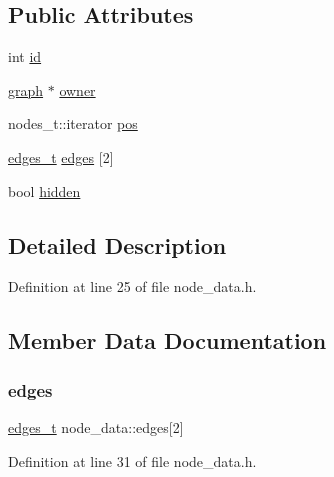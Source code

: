 \subsection*{Public Attributes}
\begin{DoxyCompactItemize}
\item 
int \mbox{\hyperlink{classnode__data_ac87541ac4470e3c17df808ec9a67f6c4}{id}}
\item 
\mbox{\hyperlink{classgraph}{graph}} $\ast$ \mbox{\hyperlink{classnode__data_a20acb07c56fa28df6cbdbf3b0a02cb66}{owner}}
\item 
nodes\+\_\+t\+::iterator \mbox{\hyperlink{classnode__data_ab3deb00e39c12058e58a99a38507f344}{pos}}
\item 
\mbox{\hyperlink{edge_8h_a8f9587479bda6cf612c103494b3858e3}{edges\+\_\+t}} \mbox{\hyperlink{classnode__data_a91690d6d2594423c2cdf8ea083c8bd75}{edges}} \mbox{[}2\mbox{]}
\item 
bool \mbox{\hyperlink{classnode__data_a0a841a84f5038562908d726392ce1b55}{hidden}}
\end{DoxyCompactItemize}


\subsection{Detailed Description}


Definition at line 25 of file node\+\_\+data.\+h.



\subsection{Member Data Documentation}
\mbox{\label{classnode__data_a91690d6d2594423c2cdf8ea083c8bd75}} 
\subsubsection{\texorpdfstring{edges}{edges}}
{\footnotesize\ttfamily \mbox{\hyperlink{edge_8h_a8f9587479bda6cf612c103494b3858e3}{edges\+\_\+t}} node\+\_\+data\+::edges\mbox{[}2\mbox{]}}



Definition at line 31 of file node\+\_\+data.\+h.

\mbox{\label{classnode__data_a0a841a84f5038562908d726392ce1b55}} 
